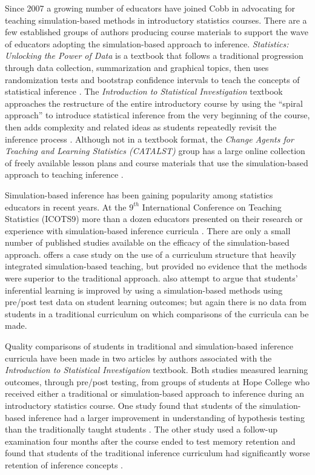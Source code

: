 \documentclass[11pt]{isuthesis}\usepackage[]{graphicx}\usepackage[]{color}
\begin{document}
Since 2007 a growing number of educators have joined Cobb in advocating for teaching simulation-based methods in introductory statistics courses. There are a few established groups of authors producing course materials to support the wave of educators adopting the simulation-based approach to inference. \textit{Statistics: Unlocking the Power of Data} is a textbook that follows a traditional progression through data collection, summarization and graphical topics, then uses randomization tests and bootstrap confidence intervals to teach the concepts of statistical inference \citep{Lock5}. The \textit{Introduction to Statistical Investigation} textbook approaches the restructure of the entire introductory course by using the ``spiral approach'' to introduce statistical inference from the very beginning of the course, then adds complexity and related ideas as students repeatedly revisit the inference process \citep{ISI}. Although not in a textbook format, the \textit{Change Agents for Teaching and Learning Statistics (CATALST)} group has a large online collection of freely available lesson plans and course materials that use the simulation-based approach to teaching inference \citep{CATALST}. 

Simulation-based inference has been gaining popularity among statistics educators in recent years.  At the $9^{th}$ International Conference on Teaching Statistics (ICOTS9) more than a dozen educators presented on their research or experience with simulation-based inference curricula \citep{ICOTS9}. There are only a small number of published studies available on the efficacy of the simulation-based approach. \citet{Carver2011} offers a case study on the use of a curriculum structure that heavily integrated simulation-based teaching, but provided no evidence that the methods were superior to the traditional approach. \citep{Budgett2013} also attempt to argue that students' inferential learning is improved by using a simulation-based methods using pre/post test data on student learning outcomes; but again there is no data from students in a traditional curriculum on which comparisons of the curricula can be made. 

Quality comparisons of students in traditional and simulation-based inference curricula have been made in two articles by authors associated with the \textit{Introduction to Statistical Investigation} textbook. Both studies measured learning outcomes, through pre/post testing, from groups of students at Hope College who received either a traditional or simulation-based approach to inference during an introductory statistics course. One study found that students of the simulation-based inference had a larger improvement in understanding of hypothesis testing than the traditionally taught students \citep{Tintle2011}. The other study used a follow-up examination four months after the course ended to test memory retention and found that students of the traditional inference curriculum had significantly worse retention of inference concepts \citep{Tintle2012}. 
\end{document}
